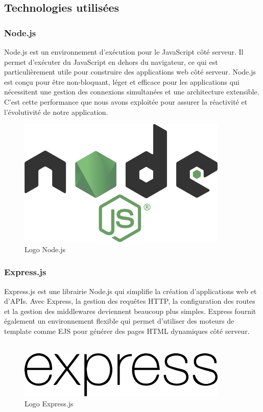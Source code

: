{\subsection*{Technologies utilisées}
\subsubsection*{Node.js}
Node.js est un environnement d'exécution pour le JavaScript côté serveur. Il permet d'exécuter du JavaScript en dehors du navigateur, ce qui est particulièrement utile pour construire des applications web côté serveur. Node.js est conçu pour être non-bloquant, léger et efficace pour les applications qui nécessitent une gestion des connexions simultanées et une architecture extensible. C'est cette performance que nous avons exploitée pour assurer la réactivité et l'évolutivité de notre application.

\begin{figure}[H]
\begin{center}
\includegraphics[width=10cm]{assets/presentation/Node_logo_NodeJS-700x428.png}
\end{center}
\caption{Logo Node.js}
\end{figure}

\subsubsection*{Express.js}
Express.js est une librairie Node.js qui simplifie la création d'applications web et d'APIs. Avec Express, la gestion des requêtes HTTP, la configuration des routes et la gestion des middlewares deviennent beaucoup plus simples. Express fournit également un environnement flexible qui permet d'utiliser des moteurs de template comme EJS pour générer des pages HTML dynamiques côté serveur.\\\\

\begin{figure}[H]
\begin{center}
\includegraphics[width=10cm]{assets/presentation/express.js_Logo-700x156.png}
\end{center}
\caption{Logo Express.js}
\end{figure}

}
